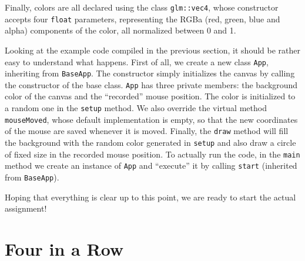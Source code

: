 \documentclass{article}
\begin{document}
Finally, colors are all declared using the class \texttt{glm::vec4}, whose constructor accepts four \texttt{float} parameters, representing the RGBa (red, green, blue and alpha) components of the color, all normalized between 0 and 1.

Looking at the example code compiled in the previous section, it should be rather easy to understand what happens. First of all, we create a new class \texttt{App}, inheriting from \texttt{BaseApp}. The constructor simply initializes the canvas by calling the constructor of the base class. \texttt{App} has three private members: the background color of the canvas and the ``recorded'' mouse position. The color is initialized to a random one in the \texttt{setup} method. We also override the virtual method \texttt{mouseMoved}, whose default implementation is empty, so that the new coordinates of the mouse are saved whenever it is moved. Finally, the \texttt{draw} method will fill the background with the random color generated in \texttt{setup} and also draw a circle of fixed size in the recorded mouse position. To actually run the code, in the \texttt{main} method we create an instance of \texttt{App} and ``execute'' it by calling \texttt{start} (inherited from \texttt{BaseApp}).

Hoping that everything is clear up to this point, we are ready to start the actual assignment!



\section{Four in a Row}
\end{document}
